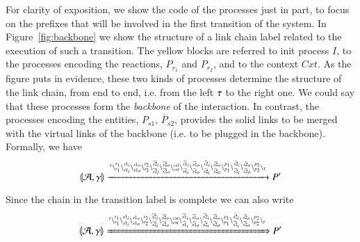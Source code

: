\begin{example}
\[\begin{array}{rcl}
\end{array}
\]  \\
For clarity of exposition, we show the code of the processes just in part, to focus on the prefixes that will be involved in the first transition of the system. In Figure~\ref{fig:backbone} we show the  structure of a link chain label related to the execution of such a transition. The yellow blocks are referred to init process $I$, to the processes encoding the reactions, $P_{r_1}$ and $P_{r_2}$, and to the context $\mathit{Cxt}$. As the figure puts in evidence, these two kinds of processes determine the structure of the link chain, from end to end, i.e. from the left $\tau$ to the right one. We could say that these processes form the \emph{backbone} of the interaction.
   In contrast, the processes encoding the entities, $P_{s1}$,  $\overline{P}_{s2}$, provides the
    solid links to be merged with the virtual links of the backbone (i.e. to be plugged in the backbone).
 Formally, we have
 $$
 \llparenthesis{\cal A},\gamma\rrparenthesis \xrightarrow{
 {}^{\tau}
 \backslash_{r_1}^{r_1}
 \backslash_{s1_i}^{s1_i}
 \backslash_{s1_o}^{s1_o}
 \backslash_{r_2}^{r_2}
 \backslash_{\overline{s2}_i}^{\overline{s2}_i}
 \backslash_{\overline{s2}_o}^{\overline{s2}_o}
 \backslash_{\mathit{cxt}}^{\mathit{cxt}}
 \backslash_{\widehat{s1}_i}^{\widehat{s1}_i}
 \backslash_{\widehat{s1}_o}^{\widehat{s1}_o}
  \backslash_{\widehat{s2}_i}^{\widehat{s2}_i}
  \backslash_{\widehat{s2}_o}^{\widehat{s2}_o}
  \backslash_{p_1}^{p_1}
  \backslash_{\widetilde{s2}_i}^{\widetilde{s2}_i}
  \backslash_{\widetilde{s2}_o}^{\widetilde{s2}_o}
  \backslash_{p_2}^{p_2}
  \backslash_{\tau}
 }
 P'
 $$
 
 Since the chain in the transition label is complete we can also write
  $$
 \llparenthesis{\cal A},\gamma\rrparenthesis \xRightarrow{
 \ensuremath{{}^{\tau}}
 \ensuremath{\backslash_{r_1}^{r_1}}
 \ensuremath{\backslash_{s1_i}^{s1_i}}
 \ensuremath{\backslash_{s1_o}^{s1_o}}
 \ensuremath{\backslash_{r_2}^{r_2}}
 \ensuremath{\backslash_{\overline{s2}_i}^{\overline{s2}_i}}
 \ensuremath{\backslash_{\overline{s2}_o}^{\overline{s2}_o}}
 \ensuremath{\backslash_{\mathit{cxt}}^{\mathit{cxt}}}
 \ensuremath{\backslash_{\widehat{s1}_i}^{\widehat{s1}_i}}
 \ensuremath{\backslash_{\widehat{s1}_o}^{\widehat{s1}_o}}
  \ensuremath{\backslash_{\widehat{s2}_i}^{\widehat{s2}_i}}
  \ensuremath{\backslash_{\widehat{s2}_o}^{\widehat{s2}_o}}
  \ensuremath{\backslash_{p_1}^{p_1}}
  \ensuremath{\backslash_{\widetilde{s2}_i}^{\widetilde{s2}_i}}
  \ensuremath{\backslash_{\widetilde{s2}_o}^{\widetilde{s2}_o}}
  \ensuremath{\backslash_{p_2}^{p_2}}
  \ensuremath{\backslash_{\tau}}
 }
 P'
 $$

 
  \begin{figure}[t]
\end{figure}
\end{example}

